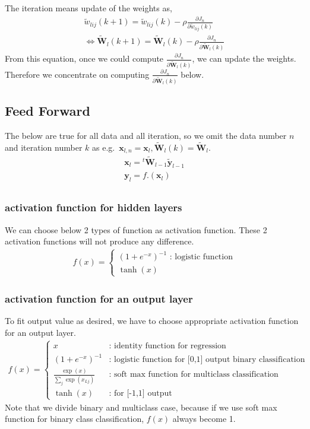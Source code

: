 \documentclass{article}
\begin{document}
The iteration means update of the weights as,
\begin{eqnarray}
  \tilde{w}_{lij}(k+1) 
  = \tilde{w}_{lij}(k) - \rho \frac{\partial J_n}{\partial
    \tilde{w}_{lij}(k)} \\
 \iff \bm{\tilde{W}}_l(k+1) 
  = \bm{\tilde{W}}_{l}(k) - \rho \frac{\partial J_n}{\partial
    \bm{\tilde{W}}_{l}(k)} \label{eq:weight_update}
\end{eqnarray}
From this equation, once we could compute $\frac{\partial J_n}{\partial
  \bm{\tilde{W}}_{l}(k)}$, we can update the weights.
Therefore we concentrate on computing $\frac{\partial J_n}{\partial
  \bm{\tilde{W}}_{l}(k)}$ below.

\subsection{Feed Forward}
The below are true for all data and all iteration,
so we omit the data number $n$ and iteration number $k$ as 
e.g.\ $\bm{x}_{l,n} = \bm{x}_l, \bm{\tilde{W}}_l(k) = \bm{\tilde{W}}_l$.
\begin{eqnarray}
  \bm{x}_l = {}^t\bm{\tilde{W}}_{l-1} \bm{\tilde{y}}_{l-1} \\
  \bm{y}_l = f.(\bm{x}_l) \\
\end{eqnarray}

\subsubsection{activation function for hidden layers}
We can choose below 2 types of function as activation function.
These 2 activation functions will not produce any difference.
\begin{eqnarray}
  f(x) = 
  \begin{cases}
    (1+e^{-x})^{-1} \mbox{ : logistic function}\\
    \tanh(x) 
  \end{cases} \label{eq:activation hidden}
\end{eqnarray}

\subsubsection{activation function for an output layer}
To fit output value as desired, we have to choose appropriate activation
function for an output layer.
\begin{eqnarray}
  f(x) = 
  \begin{cases}
    x &\mbox{: identity function for regression}\\
    (1+e^{-x})^{-1} &\mbox{: logistic function for [0,1] output binary
    classification}\\
  \frac{\exp(x)}{\sum_j \exp(x_{Lj})} &\mbox{: soft max function for multiclass
  classification}\\
    \tanh(x) &\mbox{: for [-1,1] output}
  \end{cases} \label{eq:activation out}
\end{eqnarray}
Note that we divide binary and multiclass case, because if we use soft
max function for binary class classification, $f(x)$ always become 1.
\end{document}
